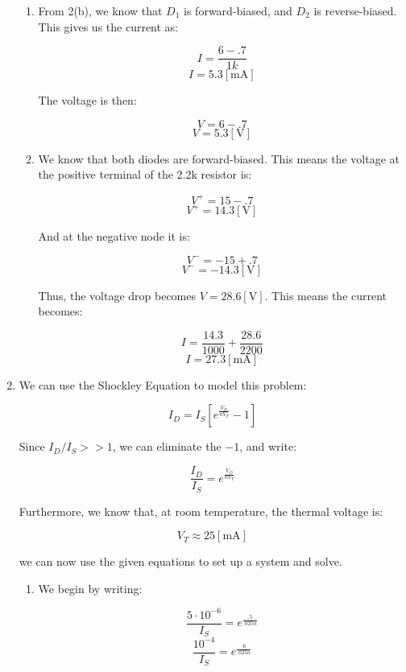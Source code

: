 \begin{enumerate}
\begin{enumerate}
      \item 

        From 2(b), we know that $D_1$ is forward-biased, and $D_2$ is reverse-biased. This gives us the current as:

        $$I=\frac{6-.7}{1k}$$
        $$\boxed{I=5.3[\si{\milli\ampere}]}$$

        The voltage is then:

        $$V=6-.7$$
        $$\boxed{V=5.3[\si{\volt}]}$$

      \item 

        We know that both diodes are forward-biased. This means the voltage at the positive terminal of the 2.2k resistor is:

        $$V^+=15-.7$$
        $$V^+=14.3[\si{\volt}]$$

        And at the negative node it is:

        $$V^-=-15+.7$$
        $$V^-=-14.3[\si{\volt}]$$

        Thus, the voltage drop becomes $\boxed{V=28.6[\si{\volt}]}$. This means the current becomes:

        $$I=\frac{14.3}{1000}+\frac{28.6}{2200}$$
        $$\boxed{I=27.3[\si{\milli\ampere}]}$$

    \end{enumerate}

  \item We can use the Shockley Equation to model this problem:

    $$I_D=I_S\left[ e^{\frac{V_D}{nV_T}} -1\right]$$

    Since $I_D/I_S>>1$, we can eliminate the $-1$, and write:

    $$\frac{I_D}{I_S}=e^{\frac{V_D}{nV_T}}$$

    Furthermore, we know that, at room temperature, the thermal voltage is:

    $$V_T\approx 25[\si{\milli\ampere}]$$

    we can now use the given equations to set up a system and solve.

    \begin{enumerate}

      \item 

        We begin by writing:

        $$\frac{5\cdot10^{-6}}{I_S}=e^{\frac{.5}{.025n}}$$
        $$\frac{10^{-4}}{I_S}=e^{\frac{.6}{.025n}}$$


\end{enumerate}
\end{enumerate}
